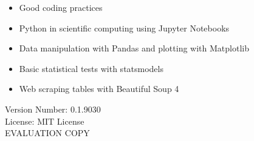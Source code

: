 \documentclass{book}
\newcommand{\booklicense}{MIT License}
\newcommand{\bookversion}{0.1.9030}
\begin{document}
\begin{titlepage}
\begin{flushleft}
\begin{tcolorbox}[skin = widget, boxrule = 1mm, coltitle = white, colframe = white, colback = white, width=(\textwidth), before=\hfill, after=\hfill]
\begin{itemize}
    \item Good coding practices
    \item Python in scientific computing using Jupyter Notebooks
    \item Data manipulation with Pandas and plotting with Matplotlib
    \item Basic statistical tests with statsmodels
    \item Web scraping tables with Beautiful Soup 4
\end{itemize}
\vspace{5mm}
Version Number: \bookversion\\
License: \booklicense\\
EVALUATION COPY
\vspace{3cm}
\end{tcolorbox}
\end{flushleft}
\end{titlepage}
\restoregeometry
\end{document}

